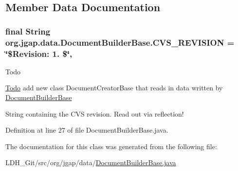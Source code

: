 \subsection{Member Data Documentation}
\hypertarget{classorg_1_1jgap_1_1data_1_1_document_builder_base_a4a15b7fd875043a3c021b54766f9a8ca}{
\subsubsection[{C\-V\-S\-\_\-\-R\-E\-V\-I\-S\-I\-O\-N}]{\setlength{\rightskip}{0pt plus 5cm}final String org.\-jgap.\-data.\-Document\-Builder\-Base.\-C\-V\-S\-\_\-\-R\-E\-V\-I\-S\-I\-O\-N = \char`\"{}\$Revision\-: 1. \$\char`\"{}\hspace{0.3cm}{\ttfamily [static]}, {\ttfamily [private]}}}\label{classorg_1_1jgap_1_1data_1_1_document_builder_base_a4a15b7fd875043a3c021b54766f9a8ca}
\begin{DoxyRefDesc}{Todo}
\item[\hyperlink{todo__todo000055}{Todo}]add new class Document\-Creator\-Base that reads in data written by \hyperlink{classorg_1_1jgap_1_1data_1_1_document_builder_base}{Document\-Builder\-Base} \end{DoxyRefDesc}
String containing the C\-V\-S revision. Read out via reflection! 

Definition at line 27 of file Document\-Builder\-Base.\-java.



The documentation for this class was generated from the following file\-:\begin{DoxyCompactItemize}
\item 
L\-D\-H\-\_\-\-Git/src/org/jgap/data/\hyperlink{_document_builder_base_8java}{Document\-Builder\-Base.\-java}\end{DoxyCompactItemize}
